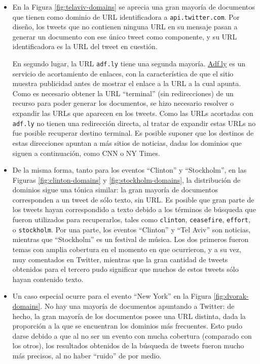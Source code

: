 \begin{itemize}

\item En la Figura \ref{fig:telaviv-domains} se aprecia una gran
      mayoría de documentos que tienen como dominio de URL identificadora a \texttt{api.twitter.com}.
      Por diseño, los tweets que no contienen ninguna URL en su mensaje pasan a generar
      un documento con ese único tweet como componente, y su URL identificadora es la URL
      del tweet en cuestión.

      En segundo lugar, la URL \texttt{adf.ly} tiene una segunda
      mayoría. \hyperref[sec-4.4.1]{Adf.ly} es un servicio de acortamiento de enlaces, con
      la característica de que el sitio muestra publicidad antes de
      mostrar el enlace a la URL a la cual apunta. Como es necesario obtener
      la URL ``terminal'' (sin redirecciones) de un recurso para poder generar los 
      documentos, se hizo necesario resolver o expandir las URLs que aparecen en los tweets.
      Como las URLs acortadas con \texttt{adf.ly} no tienen una
      redirección directa, al tratar de expandir estas URLs no fue
      posible recuperar destino terminal. Es posible suponer que los
      destinos de estas direcciones apuntan a más sitios de noticias,
      dadas los dominios que siguen a continuación, como CNN o NY
      Times.


\item De la misma forma, tanto para los eventos ``Clinton'' y
      ``Stockholm'', en las Figuras \ref{fig:clinton-domains} y
      \ref{fig:stockholm-domains}, la distribución de dominios sigue una tónica
      similar: la gran mayoría de documentos corresponden a un tweet
      de sólo texto, sin URL. Es posible que gran parte de los tweets
      hayan correspondido a texto debido a los términos de búsqueda
      que fueron utilizados para recuperarlos, tales como \texttt{clinton},
      \texttt{ceasefire}, \texttt{effort}, o \texttt{stockholm}. Por una parte,
      los eventos ``Clinton'' y ``Tel Aviv'' son noticias, mientras que ``Stockholm''
      es un festival de música. Los dos primeros fueron temas con amplia cobertura en
      el momento en que ocurrieron, y a su vez, muy comentados en Twitter, 
      mientras que la gran cantidad de tweets obtenidos para el tercero
      pudo significar que muchos de estos tweets sólo hayan contenido texto.


\item Un caso especial ocurre para el evento ``New York'' en la Figura
      \ref{fig:dvorak-domains}. No hay una mayoría de documentos
      apuntando a Twitter: de hecho, la gran mayoría de los documentos
      posee una URL distinta, dada la proporción a la que se
      encuentran los dominios más frecuentes. Esto pudo darse debido a que al no ser un evento
      con mucha cobertura (comparado con los otros), los resultados obtenidos de la búsqueda de 
      tweets fueron mucho más precisos, al no haber ``ruido'' de por medio.


\end{itemize}
